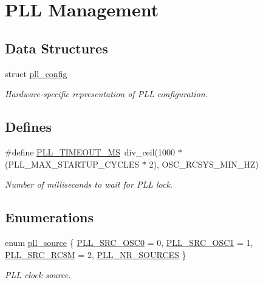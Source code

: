 \hypertarget{group__pll__group}{
\section{\-P\-L\-L \-Management}
\label{group__pll__group}
}
\subsection*{\-Data \-Structures}
\begin{DoxyCompactItemize}
\item 
struct \hyperlink{structpll__config}{pll\-\_\-config}
\begin{DoxyCompactList}\small\item\em \-Hardware-\/specific representation of \-P\-L\-L configuration. \end{DoxyCompactList}\end{DoxyCompactItemize}
\subsection*{\-Defines}
\begin{DoxyCompactItemize}
\item 
\#define \hyperlink{group__pll__group_ga3778ecbe3fb3e8480ce23312a613a0aa}{\-P\-L\-L\-\_\-\-T\-I\-M\-E\-O\-U\-T\-\_\-\-M\-S}~div\-\_\-ceil(1000 $\ast$ (\-P\-L\-L\-\_\-\-M\-A\-X\-\_\-\-S\-T\-A\-R\-T\-U\-P\-\_\-\-C\-Y\-C\-L\-E\-S $\ast$ 2), \-O\-S\-C\-\_\-\-R\-C\-S\-Y\-S\-\_\-\-M\-I\-N\-\_\-\-H\-Z)
\begin{DoxyCompactList}\small\item\em \-Number of milliseconds to wait for \-P\-L\-L lock. \end{DoxyCompactList}\end{DoxyCompactItemize}
\subsection*{\-Enumerations}
\begin{DoxyCompactItemize}
\item 
enum \hyperlink{group__pll__group_gacfb06d8fc0ffbe934077438884ae697f}{pll\-\_\-source} \{ \hyperlink{group__pll__group_ggacfb06d8fc0ffbe934077438884ae697fa060f32d7388cf128f527739090aa4217}{\-P\-L\-L\-\_\-\-S\-R\-C\-\_\-\-O\-S\-C0} =  0, 
\hyperlink{group__pll__group_ggacfb06d8fc0ffbe934077438884ae697fa28e003235f43b85c6ee49bbe81b67218}{\-P\-L\-L\-\_\-\-S\-R\-C\-\_\-\-O\-S\-C1} =  1, 
\hyperlink{group__pll__group_ggacfb06d8fc0ffbe934077438884ae697fa87507b481d2c92b721d802a5ae6cc8a5}{\-P\-L\-L\-\_\-\-S\-R\-C\-\_\-\-R\-C8\-M} =  2, 
\hyperlink{group__pll__group_ggacfb06d8fc0ffbe934077438884ae697fa5020b47784b860efae2c423d33999dcc}{\-P\-L\-L\-\_\-\-N\-R\-\_\-\-S\-O\-U\-R\-C\-E\-S}
 \}
\begin{DoxyCompactList}\small\item\em \-P\-L\-L clock source. \end{DoxyCompactList}\end{DoxyCompactItemize}
